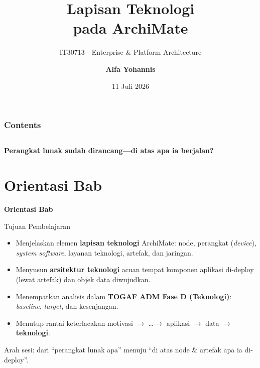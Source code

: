 \documentclass[aspectratio=169, table]{beamer}
\title{\huge Lapisan Teknologi\\
  \vspace{8pt}
  pada ArchiMate}
\subtitle{IT30713 - Enterprise \& Platform Architecture}
\author{\textbf{Alfa Yohannis}}
\date{11 Juli 2026}
\newcommand{\sectionframe}[1]{%
  \begin{frame}{\hfill}
    \centering
    \Huge{\textbf{#1}}
  \end{frame}
}
\newcommand{\takeaway}[1]{%
  \vspace{4pt}
  {\footnotesize #1}
}
\begin{document}
\frame{\titlepage}

\begin{frame}[fragile]
  \frametitle{Contents}
  \vspace{20pt}
  \begin{columns}[t]
    \tableofcontents[sections={1-4}]

    \tableofcontents[sections={5-8}]
  \end{columns}
\end{frame}

\begin{frame}{\hfill}
  \centering
  \Huge{\textbf{Perangkat lunak sudah dirancang---di atas apa ia berjalan?}}
\end{frame}

\section{Orientasi Bab}
\sectionframe{Orientasi Bab}

\begin{frame}{Tujuan Pembelajaran}
  \vspace{6pt}
  \begin{itemize}
    \item Menjelaskan elemen \textbf{lapisan teknologi} ArchiMate: node, perangkat
          (\emph{device}), \emph{system software}, layanan teknologi, artefak, dan
          jaringan.
    \item Menyusun \textbf{arsitektur teknologi} acuan tempat komponen aplikasi
          di-deploy (lewat artefak) dan objek data diwujudkan.
    \item Menempatkan analisis dalam \textbf{TOGAF ADM Fase D (Teknologi)}:
          \emph{baseline}, \emph{target}, dan kesenjangan.
    \item Menutup rantai keterlacakan motivasi $\rightarrow$ \dots $\rightarrow$
          aplikasi $\rightarrow$ data $\rightarrow$ \textbf{teknologi}.
  \end{itemize}
  \takeaway{Arah sesi: dari ``perangkat lunak apa'' menuju ``di atas node \&
  artefak apa ia di-deploy''.}
\end{frame}
\end{document}
